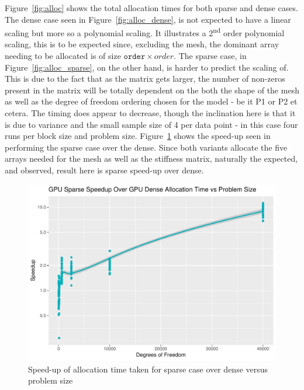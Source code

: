 Figure~\ref{fig:alloc} shows the total allocation times for both sparse and dense cases. The dense case seen in Figure~\ref{fig:alloc_dense}, is not expected to have a linear scaling but more so a polynomial scaling. It illustrates a 2\textsuperscript{nd} order polynomial scaling, this is to be expected since, excluding the mesh, the dominant array needing to be allocated is of size $\texttt{order}\times{order}$. The sparse case, in Figure~\ref{fig:alloc_sparse}, on the other hand, is harder to predict the scaling of. This is due to the fact that as the matrix gets larger, the number of non-zeros present in the matrix will be totally dependent on the both the shape of the mesh as well as the degree of freedom ordering chosen for the model - be it P1 or P2 et cetera. The timing does appear to decrease, though the inclination here is that it is due to variance and the small sample size of 4 per data point - in this case four runs per block size and problem size. Figure~\ref{fig:alloc_su} shows the speed-up seen in performing the sparse case over the dense. Since both variants allocate the five arrays needed for the mesh as well as the stiffness matrix, naturally the expected, and observed, result here is sparse speed-up over dense.
\begin{figure}
	\centering
	\includegraphics[width=0.48\linewidth]{Plots/alloc_sparse_dense_speedup_vs_n}
	\caption{Speed-up of allocation time taken for sparse case over dense versus problem size}
	\label{fig:alloc_su}
\end{figure}

